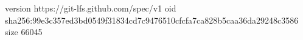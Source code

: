 version https://git-lfs.github.com/spec/v1
oid sha256:99e3c357ed3bd0549f31834cd7c9476510cfcfa7ca828b5caa36da29248c3586
size 66045
